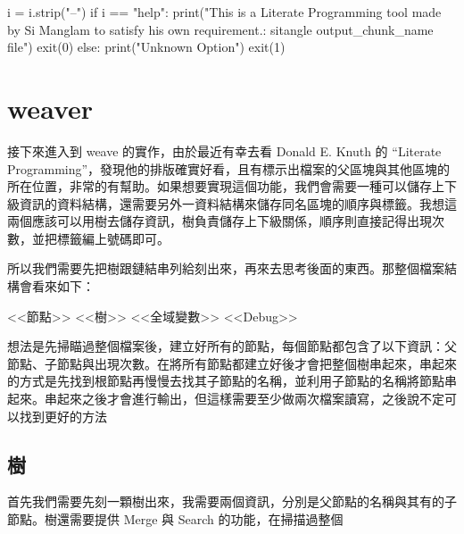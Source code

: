\documentclass[12pt, a4paper]{NGPLB}
\begin{document}
\begin{mylisting}
i = i.strip("--")
if i == "help":
	print("This is a Literate Programming tool made by Si Manglam to satisfy his own requirement.\nUsage: sitangle output_chunk_name file")
	exit(0)
else:
	print("Unknown Option")
	exit(1)
\end{mylisting}


\chapter{weaver}

接下來進入到 weave 的實作，由於最近有幸去看 Donald E. Knuth 的 ``Literate Programming''，發現他的排版確實好看，且有標示出檔案的父區塊與其他區塊的所在位置，非常的有幫助。如果想要實現這個功能，我們會需要一種可以儲存上下級資訊的資料結構，還需要另外一資料結構來儲存同名區塊的順序與標籤。我想這兩個應該可以用樹去儲存資訊，樹負責儲存上下級關係，順序則直接記得出現次數，並把標籤編上號碼即可。

所以我們需要先把樹跟鏈結串列給刻出來，再來去思考後面的東西。那整個檔案結構會看來如下：


\begin{mylisting}
<<節點>>
<<樹>>
<<全域變數>>
<<Debug>>
\end{mylisting}


想法是先掃瞄過整個檔案後，建立好所有的節點，每個節點都包含了以下資訊：父節點、子節點與出現次數。在將所有節點都建立好後才會把整個樹串起來，串起來的方式是先找到根節點再慢慢去找其子節點的名稱，並利用子節點的名稱將節點串起來。串起來之後才會進行輸出，但這樣需要至少做兩次檔案讀寫，之後說不定可以找到更好的方法

\section{樹}

首先我們需要先刻一顆樹出來，我需要兩個資訊，分別是父節點的名稱與其有的子節點。樹還需要提供 Merge 與 Search 的功能，在掃描過整個
\end{document}
